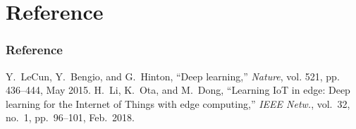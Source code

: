 \documentclass[9pt]{beamer}
\begin{document}
\section{Reference}
\begin{frame}[shrink]
    \frametitle{Reference}
    \begin{thebibliography}{100}    
         Y.~LeCun, Y.~Bengio, and G.~Hinton, ``Deep learning,'' \emph{Nature}, vol. 521, pp. 436--444, May 2015.
         H.~Li, K.~Ota, and M.~Dong, ``Learning IoT in edge: Deep learning for the Internet of Things with edge computing,'' \emph{IEEE Netw.}, vol.~32, no.~1, pp.~96--101, Feb.~2018.
    \end{thebibliography}    
\end{frame}
\end{document}

